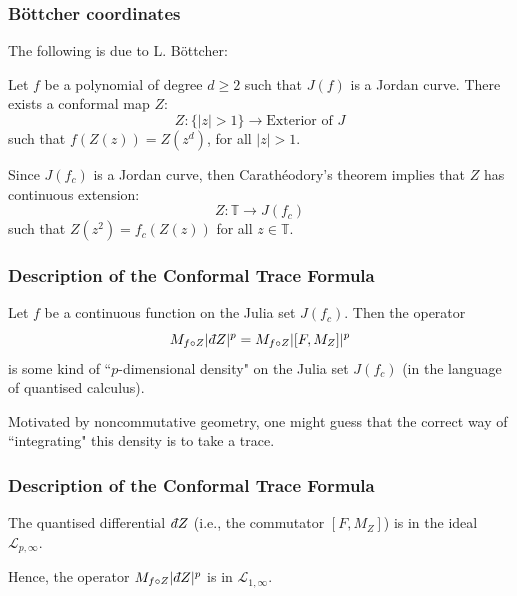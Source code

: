 \documentclass{beamer} %
\theoremstyle{definition} %
\newcommand{\Circ}{\mathbb{T}}
\newcommand{\Lc}{\mathcal{L}}
\def\qd{\,{\mathchar'26\mkern-12mu d}}
\begin{document}
\begin{frame}\frametitle{B\"ottcher coordinates}
    
    The following is due to L. B\"ottcher:
    \begin{theorem}
        Let $f$ be a polynomial of degree $d \geq 2$ such that $J(f)$ is a Jordan curve. There exists a conformal map $Z$:
        \begin{equation*}
            Z:\{|z| > 1\}\to \text{Exterior of }J
        \end{equation*}
        such that $f(Z(z)) = Z(z^d)$, for all $|z| > 1$.
    \end{theorem}
    Since $J(f_c)$ is a Jordan curve, then Carath\'eodory's theorem implies that $Z$ has continuous extension:
    \begin{equation*}
        Z:\Circ\to J(f_c)
    \end{equation*}
    such that $Z(z^2) = f_c(Z(z))$ for all $z \in \Circ$.
\end{frame}

\begin{frame}\frametitle{Description of the Conformal Trace Formula}
     Let $f$ be a continuous function on the Julia set $J(f_c)$. Then the operator
     \begin{equation*}
        M_{f\circ Z}|\qd Z|^p = M_{f\circ Z}|[F,M_Z]|^p
     \end{equation*}
     is some kind of ``$p$-dimensional density" on the Julia set $J(f_c)$ (in the language of quantised calculus).
     
     Motivated by noncommutative geometry, one might guess that the correct way of ``integrating" this density is to take a trace.
\end{frame}

\begin{frame}\frametitle{Description of the Conformal Trace Formula}
    \begin{lemma}
        The quantised differential $\qd Z$ (i.e., the commutator $[F,M_Z]$) is in the ideal $\Lc_{p,\infty}$.
    \end{lemma}
    Hence, the operator $M_{f\circ Z}|\qd Z|^p$ is in $\Lc_{1,\infty}$.
\end{frame}
\end{document}

